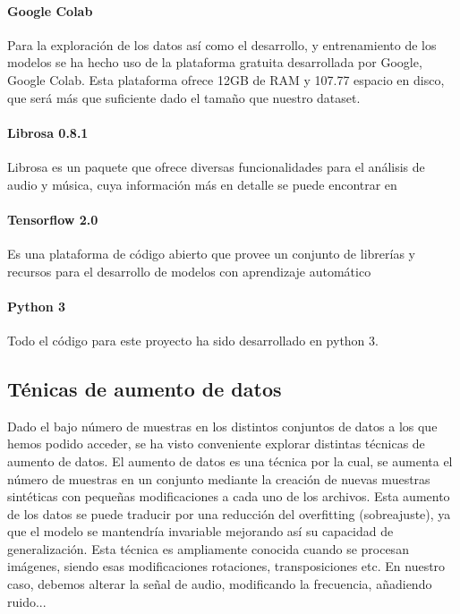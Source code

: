 \documentclass[11pt,a4paper,spanish]{book}
\begin{document}
	\paragraph{Google Colab} Para la exploración de los datos así como el desarrollo, y entrenamiento de los modelos se ha hecho uso de la plataforma gratuita desarrollada por Google, Google Colab. Esta plataforma ofrece 12GB de RAM  y 107.77 espacio en disco, que será más que suficiente dado el tamaño que nuestro dataset.
	
	\paragraph{Librosa 0.8.1} Librosa es un paquete que ofrece diversas funcionalidades para el análisis de audio y música, cuya información más en detalle se puede encontrar en \cite{librosa082}
	
	\paragraph{Tensorflow 2.0} Es una plataforma de código abierto que provee un conjunto de librerías y recursos para el desarrollo de modelos con aprendizaje automático
	
	\paragraph{Python 3} Todo el código para este proyecto ha sido desarrollado en python 3.
	
	\subsection{Ténicas de aumento de datos}
	Dado el bajo número de muestras en los distintos conjuntos de datos a los que hemos podido acceder, se ha visto conveniente explorar distintas técnicas de aumento de datos. El aumento de datos es una técnica por la cual, se aumenta el número de muestras en un conjunto mediante la creación de nuevas muestras sintéticas con pequeñas modificaciones a cada uno de los archivos. Esta aumento de los datos se puede traducir por una reducción del overfitting (sobreajuste), ya que el modelo se mantendría invariable mejorando así su capacidad de generalización.
	Esta técnica es ampliamente conocida cuando se procesan imágenes, siendo esas modificaciones rotaciones, transposiciones etc. En nuestro caso, debemos alterar la señal de audio, modificando la frecuencia, añadiendo ruido...
	
\end{document}
